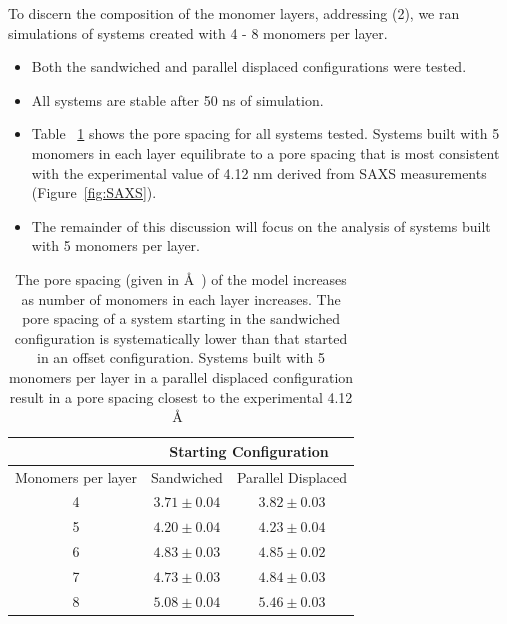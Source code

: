 \documentclass{article}
\newcommand{\angstrom}{\textup{\AA}}
\begin{document}
  To discern the composition of the monomer layers, addressing (2), we ran 
  simulations of systems created with 4 - 8 monomers per layer.  %
  \begin{itemize}
  	\item Both the sandwiched and parallel displaced configurations were tested.
	\item All systems are stable after 50 ns of simulation.  %
	\item Table ~\ref{table:p2p} shows the pore spacing for all systems tested. 
	Systems built with 5 monomers in each layer equilibrate to a pore spacing
	that is most consistent with the experimental value of 4.12 nm derived from
	SAXS measurements (Figure~\ref{fig:SAXS}).
	\item The remainder of this discussion will focus on the analysis of systems
	built with 5 monomers per layer. 
  \end{itemize}
  
  \begin{table}[h]
  \centering
  \begin{tabular}{ccc}
  \toprule
  		   & \multicolumn{2}{c}{Starting Configuration} \\
  \hline
  Monomers per layer & Sandwiched & Parallel Displaced \\
  \midrule
  4 & $3.71 \pm 0.04$ & $3.82 \pm 0.03$ \\
  5 & $4.20 \pm 0.04$ & $4.23 \pm 0.04$ \\
  6 & $4.83 \pm 0.03$ & $4.85 \pm 0.02$ \\
  7 & $4.73 \pm 0.03$ & $4.84 \pm 0.03$ \\
  8 & $5.08 \pm 0.04$ & $5.46 \pm 0.03$ \\
  \bottomrule
  \end{tabular}
  \caption{The pore spacing 
  (given in \angstrom~)
  of the model increases as number of monomers
  in each layer increases. The pore spacing of a system starting in the 
  sandwiched configuration is systematically lower than that started in an 
  offset configuration. Systems built with 5 monomers per layer in a parallel
  displaced configuration result in a pore spacing closest 
  to the experimental 4.12 \angstrom~}\label{table:p2p} 
  \end{table}
  
\end{document}
